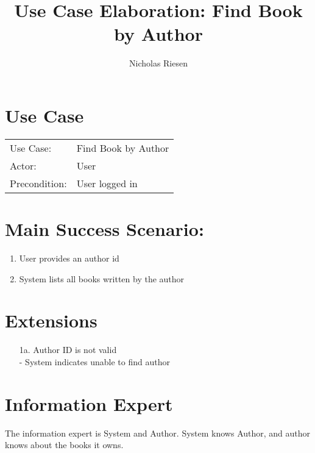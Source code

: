 \documentclass{article}
\title{Use Case Elaboration: Find Book by Author}
\author{ Nicholas Riesen }
\begin{document}
\maketitle


\section*{Use Case}
\begin{tabular}{l l}
Use Case:     & Find Book by Author\\
Actor:        & User\\
Precondition: & User logged in\\
\end{tabular}


\section*{Main Success Scenario:}

\begin{enumerate}
    \item User provides an author id
    \item System lists all books written by the author
 
\end{enumerate}

\section*{Extensions}

\begin{itemize}
    \item [1a.] Author ID is not valid \\
         - System indicates unable to find author
\end{itemize}


\section*{Information Expert}
The information expert is System and Author. System knows Author, and author knows about the books it owns.
\end{document}
